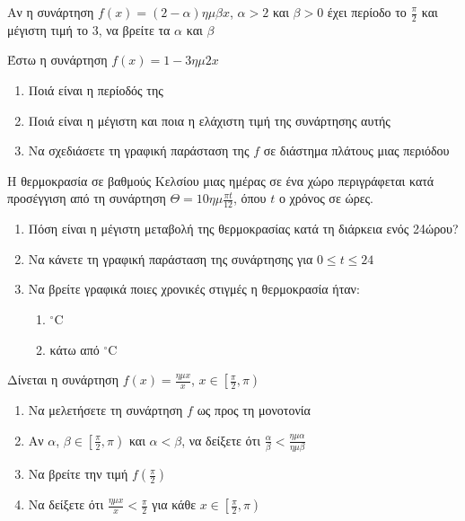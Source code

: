 \documentclass{presentation}
\begin{document}
\begin{askisi}
  Αν η συνάρτηση $f(x)=(2-α)ημβx$, $α>2$ και $β>0$ έχει περίοδο το $\frac{π}{2}$ και μέγιστη τιμή το $3$, να βρείτε τα $α$ και $β$
\end{askisi}

\begin{askisi}
  Έστω η συνάρτηση $f(x)=1-3ημ2x$
  \begin{enumerate}
    \item<1-> Ποιά είναι η περίοδός της
    \item<2-> Ποιά είναι η μέγιστη και ποια η ελάχιστη τιμή της συνάρτησης αυτής
    \item<3-> Να σχεδιάσετε τη γραφική παράσταση της $f$ σε διάστημα πλάτους μιας περιόδου
  \end{enumerate}
\end{askisi}

\begin{askisi}
  Η θερμοκρασία σε βαθμούς Κελσίου μιας ημέρας σε ένα χώρο περιγράφεται κατά προσέγγιση από τη συνάρτηση $Θ=10ημ\frac{πt}{12}$, όπου $t$ ο χρόνος σε ώρες.
  \begin{enumerate}
    \item<1-> Πόση είναι η μέγιστη μεταβολή της θερμοκρασίας κατά τη διάρκεια ενός 24ώρου?
    \item<2-> Να κάνετε τη γραφική παράσταση της συνάρτησης για $0\le t \le 24$
    \item<3-> Να βρείτε γραφικά ποιες χρονικές στιγμές η θερμοκρασία ήταν:
          \begin{enumerate}
            \item<3-> $^{\circ}$C
            \item<4-> κάτω από $^{\circ}$C
          \end{enumerate}
  \end{enumerate}
\end{askisi}

\begin{askisi}
  Δίνεται η συνάρτηση $f(x)=\frac{ημx}{x}$, $x\in\left[ \frac{π}{2},π \right) $
  \begin{enumerate}
    \item<1-> Να μελετήσετε τη συνάρτηση $f$ ως προς τη μονοτονία
    \item<2-> Αν $α$, $β\in\left[ \frac{π}{2},π \right) $ και $α<β$, να δείξετε ότι $\frac{α}{β}<\frac{ημα}{ημβ}$
    \item<3-> Να βρείτε την τιμή $f(\frac{π}{2})$
    \item<4-> Να δείξετε ότι $\frac{ημx}{x}<\frac{π}{2}$ για κάθε $x\in\left[ \frac{π}{2},π \right) $
  \end{enumerate}
\end{askisi}

\moodle

\end{document}
